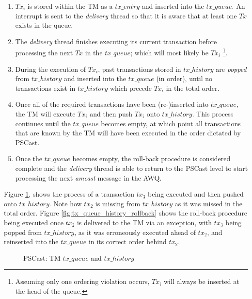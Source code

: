     \begin{enumerate}
        \item    $Tx_i$ is stored within the TM as a $tx\_entry$ and inserted into the $tx\_queue$.  An interrupt is sent to the \emph{delivery} thread so that it is aware that at least one $Tx$ exists in the queue.  
        
        \item    The \emph{delivery} thread finishes executing its current transaction before processing the next $Tx$ in the $tx\_queue$; which will most likely be $Tx_i$ \footnote{Assuming only one ordering violation occurs, $Tx_i$ will always be inserted at the head of the queue.}.
        
        \item    During the execution of $Tx_i$, past transactions stored in $tx\_history$ are \emph{popped} from $tx\_history$ and inserted into the $tx\_queue$ (in order), until no transactions exist in $tx\_history$ which precede $Tx_i$ in the total order.
        
        \item    Once all of the required transactions have been (re-)inserted into $tx\_queue$, the TM will execute $Tx_i$ and then push $Tx_i$ onto $tx\_history$.  This process continues until the $tx\_queue$ becomes empty, at which point all transactions that are known by the TM will have been executed in the order dictated by \textsf{PSCast}.  
        
        \item    Once the $tx\_queue$ becomes empty, the roll-back procedure is considered complete and the \emph{delivery} thread is able to return to the \textsf{PSCast} level to start processing the next \emph{amcast} message in the AWQ.  
    \end{enumerate}        
    
    Figure \ref{fig:tx_queue_history}, shows the process of a transaction $tx_3$ being executed and then pushed onto $tx\_history$.  Note how $tx_2$ is missing from $tx\_history$ as it was missed in the total order.  Figure \ref{fig:tx_queue_history_rollback} shows the roll-back procedure being executed once $tx_2$ is delivered to the TM via an exception, with $tx_3$ being popped from $tx\_history$, as it was erroneously executed ahead of $tx_2$, and reinserted into the $tx\_queue$ in its correct order behind $tx_2$.  
    
    \begin{figure}[h] 
        \centering
         \caption[PSCast: TM $tx\_queue$ and $tx\_history$]{PSCast: TM $tx\_queue$ and $tx\_history$}
         \label{fig:tx_queue_history}
    \end{figure}      
    
